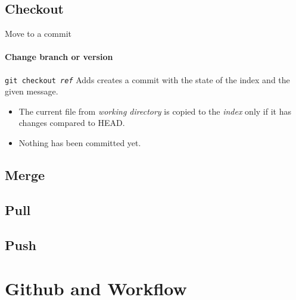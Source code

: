 \documentclass{beamer}
\begin{document}
\subsection{Checkout}

\begin{frame}{Move to a commit}
\framesubtitle{Change branch or version}

\begin{block}{	\texttt{git checkout \emph{ref}}}
	Adds creates a commit with the state of the index and the given message.
\end{block}

\begin{itemize}
	\item The current file from \emph{working directory} is copied to the \emph{index} only if it has changes compared to HEAD.
	\item Nothing has been committed yet.
\end{itemize}

\end{frame}

\subsection{Merge}

\subsection{Pull}

\subsection{Push}

\section{Github and Workflow}


    
\end{document}
